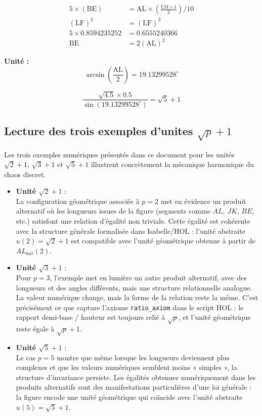 \documentclass[12pt,a4paper]{article}
\begin{document}
\begin{align}
5 \times (\mathrm{BE}) &= \mathrm{AL} \times \left(\frac{\mathrm{LM} \times 1}{2}\right) / 10 \\
(\mathrm{LF})^{2} &= (\mathrm{LF})^{2} \\
5 \times 0.8594235252 &= 0.6555240366 \\
\mathrm{BE} &= 2(\mathrm{AL})^{2}
\end{align}

\noindent\textbf{Unité :}
\[
\arcsin\left(\frac{\mathrm{AL}}{2}\right) = 19.13299528^\circ
\]

\[
\frac{\sqrt{4.5} \times 0.5}{\sin(19.13299528^\circ)} = \sqrt{5} + 1
\]

\subsection{Lecture des trois exemples d'unites \texorpdfstring{$\sqrt{p} + 1$}{sqrt(p)+1}}

Les trois exemples numériques présentés dans ce document pour les unités
$\sqrt{2} + 1$, $\sqrt{3} + 1$ et $\sqrt{5} + 1$ illustrent concrètement
la mécanique harmonique du chaos discret.

\begin{itemize}
  \item \textbf{Unité $\sqrt{2} + 1$} :\\
  La configuration géométrique associée à $p = 2$ met en évidence un produit
  alternatif où les longueurs issues de la figure (segments comme $AL$, $JK$,
  $BE$, etc.) satisfont une relation d'égalité non triviale. Cette égalité
  est cohérente avec la structure générale formalisée dans Isabelle/HOL :
  l'unité abstraite $u(2) = \sqrt{2} + 1$ est compatible avec l'unité
  géométrique obtenue à partir de $AL_{\text{nat}}(2)$.

  \item \textbf{Unité $\sqrt{3} + 1$} :\\
  Pour $p = 3$, l'exemple met en lumière un autre produit alternatif, avec
  des longueurs et des angles différents, mais une structure relationnelle
  analogue. La valeur numérique change, mais la forme de la relation reste
  la même. C'est précisément ce que capture l'axiome
  \texttt{ratio\_axiom} dans le script HOL : le rapport demi-base / hauteur
  est toujours relié à $\sqrt{p}$, et l'unité géométrique reste égale à
  $\sqrt{p} + 1$.

  \item \textbf{Unité $\sqrt{5} + 1$} :\\
  Le cas $p = 5$ montre que même lorsque les longueurs deviennent plus
  complexes et que les valeurs numériques semblent moins « simples », la
  structure d'invariance persiste. Les égalités obtenues numériquement
  dans les produits alternatifs sont des manifestations particulières
  d'une loi générale : la figure encode une unité géométrique qui coïncide
  avec l'unité abstraite $u(5) = \sqrt{5} + 1$.
\end{itemize}
\end{document}
